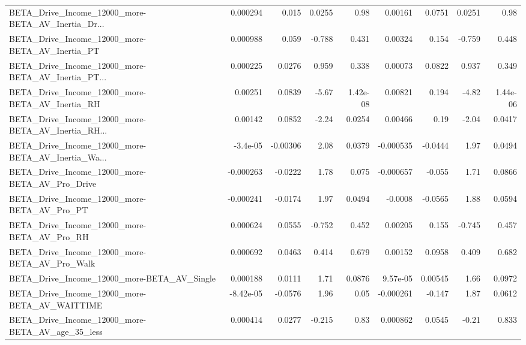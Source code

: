 \begin{tabular}{lrrrrrrrr}
BETA\_Drive\_Income\_12000\_more-BETA\_AV\_Inertia\_Dr... &    0.000294 &        0.015 &   0.0255 &     0.98 &    0.00161 &      0.0751 &       0.0251 &          0.98 \\
BETA\_Drive\_Income\_12000\_more-BETA\_AV\_Inertia\_PT    &    0.000988 &        0.059 &   -0.788 &    0.431 &    0.00324 &       0.154 &       -0.759 &         0.448 \\
BETA\_Drive\_Income\_12000\_more-BETA\_AV\_Inertia\_PT... &    0.000225 &       0.0276 &    0.959 &    0.338 &    0.00073 &      0.0822 &        0.937 &         0.349 \\
BETA\_Drive\_Income\_12000\_more-BETA\_AV\_Inertia\_RH    &     0.00251 &       0.0839 &    -5.67 & 1.42e-08 &    0.00821 &       0.194 &        -4.82 &      1.44e-06 \\
BETA\_Drive\_Income\_12000\_more-BETA\_AV\_Inertia\_RH... &     0.00142 &       0.0852 &    -2.24 &   0.0254 &    0.00466 &        0.19 &        -2.04 &        0.0417 \\
BETA\_Drive\_Income\_12000\_more-BETA\_AV\_Inertia\_Wa... &    -3.4e-05 &     -0.00306 &     2.08 &   0.0379 &  -0.000535 &     -0.0444 &         1.97 &        0.0494 \\
BETA\_Drive\_Income\_12000\_more-BETA\_AV\_Pro\_Drive     &   -0.000263 &      -0.0222 &     1.78 &    0.075 &  -0.000657 &      -0.055 &         1.71 &        0.0866 \\
BETA\_Drive\_Income\_12000\_more-BETA\_AV\_Pro\_PT        &   -0.000241 &      -0.0174 &     1.97 &   0.0494 &    -0.0008 &     -0.0565 &         1.88 &        0.0594 \\
BETA\_Drive\_Income\_12000\_more-BETA\_AV\_Pro\_RH        &    0.000624 &       0.0555 &   -0.752 &    0.452 &    0.00205 &       0.155 &       -0.745 &         0.457 \\
BETA\_Drive\_Income\_12000\_more-BETA\_AV\_Pro\_Walk      &    0.000692 &       0.0463 &    0.414 &    0.679 &    0.00152 &      0.0958 &        0.409 &         0.682 \\
BETA\_Drive\_Income\_12000\_more-BETA\_AV\_Single        &    0.000188 &       0.0111 &     1.71 &   0.0876 &   9.57e-05 &     0.00545 &         1.66 &        0.0972 \\
BETA\_Drive\_Income\_12000\_more-BETA\_AV\_WAITTIME      &   -8.42e-05 &      -0.0576 &     1.96 &     0.05 &  -0.000261 &      -0.147 &         1.87 &        0.0612 \\
BETA\_Drive\_Income\_12000\_more-BETA\_AV\_age\_35\_less   &    0.000414 &       0.0277 &   -0.215 &     0.83 &   0.000862 &      0.0545 &        -0.21 &         0.833 \\

\end{tabular}

